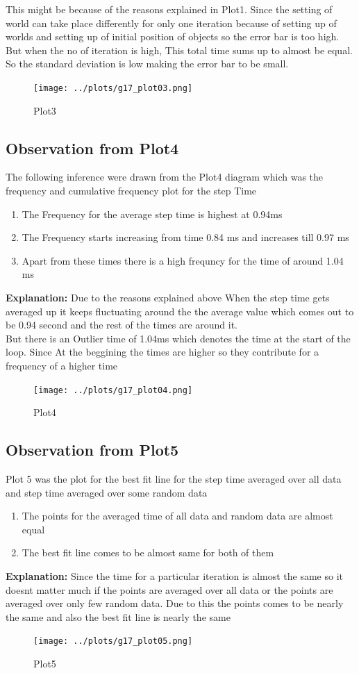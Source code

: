 \documentclass[11pt,]{article}
\begin{document}
\begin{singlespace}
This might be because of the reasons explained in Plot1. Since the setting of world can take place differently for only one iteration because of 
setting up of worlds and setting up of initial position of objects so the error bar is too high. But when the no of iteration is high, This total 
time sums up to almost be equal. So the standard deviation is low making the error bar to be small. 
\begin{figure}[!ht]
	\centering
	\caption{Plot3}
		\texttt{[image: ../plots/g17\_plot03.png]}
\end{figure}
\subsection{Observation from Plot4}
The following inference were drawn from the Plot4 diagram which was the frequency and cumulative frequency plot for the step Time
\begin{enumerate}
    \item The Frequency for the average step time is highest at 0.94ms
    \item The Frequency starts increasing from time 0.84 ms and increases till 0.97 ms 
    \item Apart from these times there is a high frequncy for the time of around 1.04 ms
\end{enumerate}
\textbf{Explanation:}
Due to the reasons explained above When the step time gets averaged up it keeps fluctuating around the the average value which comes out to be 
0.94 second and the rest of the times are around it.\\

But there is an Outlier time of 1.04ms which denotes the time at the start of the loop. Since  At the beggining the times are higher so they 
contribute for a frequency of a higher time
\begin{figure}[!ht]
	\centering
	\caption{Plot4}
		\texttt{[image: ../plots/g17\_plot04.png]}
\end{figure}
\subsection{Observation from Plot5}
Plot 5 was the plot for the best fit line for the step time averaged over all data and step time averaged over some random data
\begin{enumerate}
    \item The points for the averaged time of all data and random data are almost equal 
    \item The best fit line comes to be almost same for both of them
\end{enumerate}
\textbf{Explanation:}
	Since the time for a particular iteration is almost the same so it doesnt matter much if the points are averaged over all data or 
the  points are averaged over only few random data. Due to this the points comes to be nearly the same and also the best fit line is nearly 
the same
\begin{figure}[!ht]
	\centering
	\caption{Plot5}
		\texttt{[image: ../plots/g17\_plot05.png]}
\end{figure}

\end{singlespace}
\end{document}
